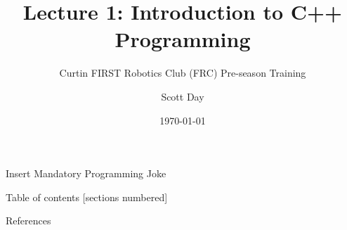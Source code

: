 \documentclass[9pt]{beamer}              %
\title{Lecture 1: Introduction to C++ Programming}
\subtitle{Curtin FIRST Robotics Club (FRC) Pre-season Training}
\date{\today}
\author{Scott Day}
\institute{Curtin University}
\begin{document}


\maketitle

\begin{frame}[fragile]{Insert Mandatory Programming Joke}
    \begin{center}
    \end{center}
\end{frame}

\begin{frame}{Table of contents}
  [sections numbered]
  \tableofcontents[hideallsubsections]
\end{frame}









\begin{frame}[allowframebreaks]{References}
    
    
\end{frame}


\end{document}
